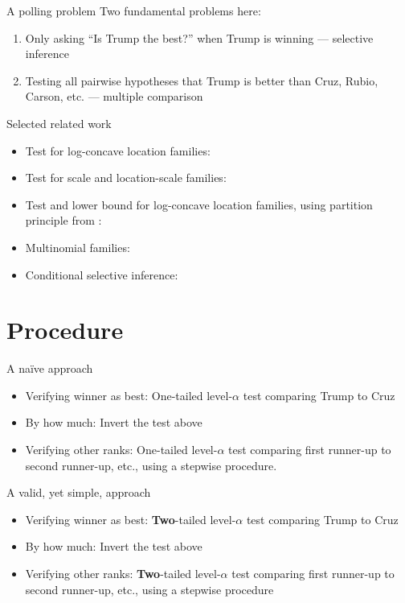 \documentclass{beamer}
\begin{document}
\begin{frame}{A polling problem}
Two fundamental problems here:
\begin{enumerate}
	\item Only asking ``Is Trump the best?'' when Trump is winning --- selective inference
	\item Testing all pairwise hypotheses that Trump is better than Cruz, Rubio, Carson, etc. --- multiple comparison
\end{enumerate}
\end{frame}

\begin{frame}{Selected related work}
\begin{itemize}
\item Test for log-concave location families: \citet{Gutmann:1987fk}
\item Test for scale and location-scale families: \citet{Bofinger:1991hv,Maymin:1992fz,Karnnan:2009iv}
\item Test and lower bound for log-concave location families, using partition principle from \citet{Finner:2002ju}: \citet{Stefansson:1988wj}
\item Multinomial families: \citet{Gupta:1967wg}
\item Conditional selective inference: \citet{Fithian:2014ws}
\end{itemize}
\end{frame}

\section{Procedure}

\begin{frame}{A na\"ive approach}
\begin{itemize}
\item Verifying winner as best: One-tailed level-$\alpha$ test comparing Trump to Cruz
\item By how much: Invert the test above
\item Verifying other ranks: One-tailed level-$\alpha$ test comparing first runner-up to second runner-up, etc., using a stepwise procedure.
\end{itemize}
\end{frame}

\begin{frame}{A valid, yet simple, approach}
\begin{itemize}
\item Verifying winner as best: {\bf Two}-tailed level-$\alpha$ test comparing Trump to Cruz
\item By how much: Invert the test above
\item Verifying other ranks: {\bf Two}-tailed level-$\alpha$ test comparing first runner-up to second runner-up, etc., using a stepwise procedure
\end{itemize}
\end{frame}
\end{document}
